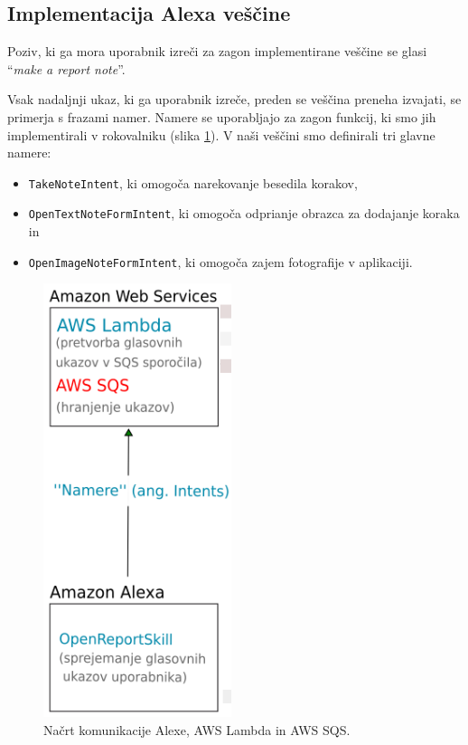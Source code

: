 \documentclass[a4paper, 12pt]{book}
\begin{document}

\subsection{Implementacija Alexa veščine}

Poziv, ki ga mora uporabnik izreči za zagon implementirane veščine se glasi \enquote{\textit{make a report note}}.

Vsak nadaljnji ukaz, ki ga uporabnik izreče, preden se veščina preneha izvajati, se primerja s frazami namer.
Namere se uporabljajo za zagon funkcij, ki smo jih implementirali v rokovalniku (slika \ref{plan_alexa_sqs}).
V naši veščini smo definirali tri glavne namere:

\begin{itemize}
	\item \texttt{TakeNoteIntent}, ki omogoča narekovanje besedila korakov,
	\item \texttt{OpenTextNoteFormIntent}, ki omogoča odprianje obrazca za dodajanje koraka in
	\item \texttt{OpenImageNoteFormIntent}, ki omogoča zajem fotografije v aplikaciji.
\end{itemize}

\clearpage

\begin{figure}[H]
\begin{center}
\includegraphics[width=5.5cm]{plan_alexa_sqs}
\end{center}
\caption{Načrt komunikacije Alexe, AWS Lambda in AWS SQS.}
\label{plan_alexa_sqs}
\end{figure}
\end{document}
